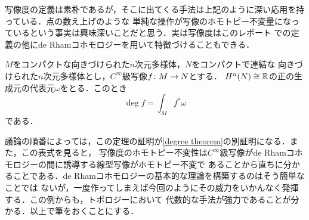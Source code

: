 \documentclass[dvipdfmx,uplatex]{jsarticle}
\begin{document}
\newpage
写像度の定義は素朴であるが，そこに出てくる手法は上記のように深い応用を持っている．点の数え上げのような
単純な操作が写像のホモトピー不変量になっているという事実は興味深いことだと思う．実は写像度はこのレポート
での定義の他にde Rhamコホモロジーを用いて特徴づけることもできる．

\begin{theorem}
$M$をコンパクトな向きづけられた$n$次元多様体，$N$をコンパクトで連結な
向きづけられた$n$次元多様体とし，$C^\infty$級写像$f\colon M\to N$とする．
$H^n(N)\cong \mathbb{R}$の正の生成元の代表元$\omega$をとる．このとき
\[ \deg f = \int_M f^\ast \omega \]
である．
\end{theorem}
議論の順番によっては，この定理の証明が\cref{degree theorem}の別証明になる．また，この表式を見ると，
写像度のホモトピー不変性は$C^\infty$級写像がde Rhamコホモロジーの間に誘導する線型写像がホモトピー不変で
あることから直ちに分かることである．de Rhamコホモロジーの基本的な理論を構築するのはそう簡単なことでは
ないが，一度作ってしまえば今回のようにその威力をいかんなく発揮する．この例からも，トポロジーにおいて
代数的な手法が強力であることが分かる．以上で筆をおくことにする．
\end{document}
